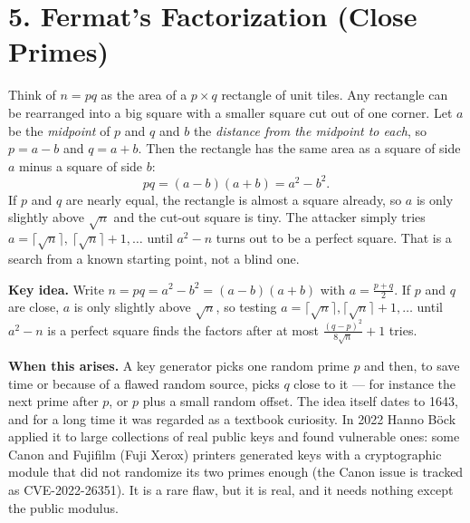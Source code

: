 \documentclass[11pt]{article}
\begin{document}
\hrulefill

\section*{5. Fermat's Factorization (Close Primes)}

\begin{intuition}
Think of $n=pq$ as the area of a $p\times q$ rectangle of unit tiles. Any rectangle can be rearranged into a big square with a smaller square cut out of one corner. Let $a$ be the \emph{midpoint} of $p$ and $q$ and $b$ the \emph{distance from the midpoint to each}, so $p=a-b$ and $q=a+b$. Then the rectangle has the same area as a square of side $a$ minus a square of side $b$:
\[ pq=(a-b)(a+b)=a^2-b^2. \]
If $p$ and $q$ are nearly equal, the rectangle is almost a square already, so $a$ is only slightly above $\sqrt n$ and the cut-out square is tiny. The attacker simply tries $a=\lceil\sqrt n\rceil,\ \lceil\sqrt n\rceil+1,\dots$ until $a^2-n$ turns out to be a perfect square. That is a search from a known starting point, not a blind one.
\end{intuition}

\textbf{Key idea.} Write $n=pq=a^2-b^2=(a-b)(a+b)$ with $a=\tfrac{p+q}{2}$. If $p$ and $q$ are close, $a$ is only slightly above $\sqrt n$, so testing $a=\lceil\sqrt n\rceil,\lceil\sqrt n\rceil+1,\dots$ until $a^2-n$ is a perfect square finds the factors after at most $\tfrac{(q-p)^2}{8\sqrt n}+1$ tries.

\textbf{When this arises.} A key generator picks one random prime $p$ and then, to save time or because of a flawed random source, picks $q$ close to it --- for instance the next prime after $p$, or $p$ plus a small random offset. The idea itself dates to 1643, and for a long time it was regarded as a textbook curiosity. In 2022 Hanno Böck applied it to large collections of real public keys and found vulnerable ones: some Canon and Fujifilm (Fuji Xerox) printers generated keys with a cryptographic module that did not randomize its two primes enough (the Canon issue is tracked as CVE-2022-26351). It is a rare flaw, but it is real, and it needs nothing except the public modulus.
\end{document}
